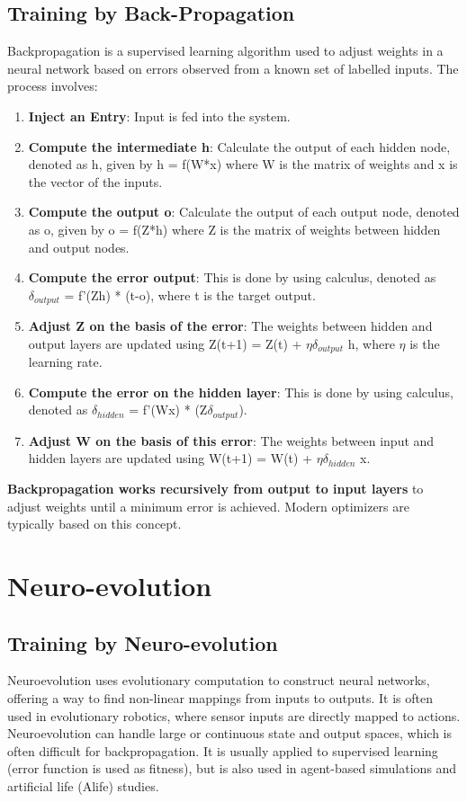 \subsection*{Training by Back-Propagation}
Backpropagation is a supervised learning algorithm used to adjust weights in a neural network based on errors observed from a known set of labelled inputs. The process involves:
\begin{enumerate}
    \item \textbf{Inject an Entry}: Input is fed into the system.
    \item \textbf{Compute the intermediate h}: Calculate the output of each hidden node, denoted as h, given by h = f(W*x) where W is the matrix of weights and x is the vector of the inputs.
    \item \textbf{Compute the output o}: Calculate the output of each output node, denoted as o, given by o = f(Z*h) where Z is the matrix of weights between hidden and output nodes.
    \item \textbf{Compute the error output}: This is done by using calculus, denoted as \(\delta_{output}\)  = f'(Zh) * (t-o), where t is the target output.
    \item \textbf{Adjust Z on the basis of the error}: The weights between hidden and output layers are updated using  Z(t+1) = Z(t) + \(\eta \delta_{output}\) h, where \(\eta\) is the learning rate.
    \item \textbf{Compute the error on the hidden layer}:  This is done by using calculus, denoted as \(\delta_{hidden}\) = f'(Wx) * (Z\(\delta_{output}\)).
    \item \textbf{Adjust W on the basis of this error}: The weights between input and hidden layers are updated using  W(t+1) = W(t) + \(\eta \delta_{hidden}\) x.
\end{enumerate}
\textbf{Backpropagation works recursively from output to input layers} to adjust weights until a minimum error is achieved. Modern optimizers are typically based on this concept.

\section{Neuro-evolution}

\subsection*{Training by Neuro-evolution}

Neuroevolution uses evolutionary computation to construct neural networks, offering a way to find non-linear mappings from inputs to outputs. It is often used in evolutionary robotics, where sensor inputs are directly mapped to actions. Neuroevolution can handle large or continuous state and output spaces, which is often difficult for backpropagation. It is usually applied to supervised learning (error function is used as fitness), but is also used in agent-based simulations and artificial life (Alife) studies.

